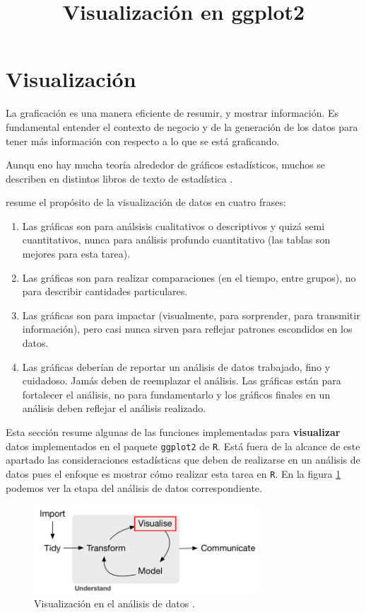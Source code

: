 \documentclass[]{article}
\title{Visualización en ggplot2}
\author{}
\date{}
\providecommand{\tightlist}{%
  \setlength{\itemsep}{0pt}\setlength{\parskip}{0pt}}
\begin{document}
\section{Visualización}\label{visualizacion}

La graficación es una manera eficiente de resumir, y mostrar
información. Es fundamental entender el contexto de negocio y de la
generación de los datos para tener más información con respecto a lo que
se está graficando.

Aunqu eno hay mucha teoría alrededor de gráficos estadísticos, muchos se
describen en distintos libros de texto de estadística
\parencite[][Introducción]{unwin2015}.

\textcite[][citando a John Tukey]{unwin2015} resume el propósito de la
visualización de datos en cuatro frases:

\begin{enumerate}
\def\labelenumi{\arabic{enumi}.}
\tightlist
\item
  Las gráficas son para análsisis cualitativos o descriptivos y quizá
  semi cuantitativos, nunca para análisis profundo cuantitativo (las
  tablas son mejores para esta tarea).
\item
  Las gráficas son para realizar comparaciones (en el tiempo, entre
  grupos), no para describir cantidades particulares.
\item
  Las gráficas son para impactar (visualmente, para sorprender, para
  transmitir información), pero casi nunca sirven para reflejar patrones
  escondidos en los datos.
\item
  Las gráficas deberían de reportar un análisis de datos trabajado, fino
  y cuidadoso. Jamás deben de reemplazar el análisis. Las gráficas están
  para fortalecer el análisis, no para fundamentarlo y los gráficos
  finales en un análisis deben reflejar el análisis realizado.
\end{enumerate}

Esta sección resume algunas de las funciones implementadas para
\textbf{visualizar} datos implementados en el paquete \texttt{ggplot2}
de \texttt{R}. Está fuera de la alcance de este apartado las
consideraciones estadísticas que deben de realizarse en un análisis de
datos pues el enfoque es mostrar cómo realizar esta tarea en \texttt{R}.
En la figura \ref{fig:ciclo4} podemos ver la etapa del análisis de datos
correspondiente.

\begin{figure}[h]
    \centering
    \includegraphics[width=0.75\textwidth]{../img/02_ciclo_4.png}
    \caption{Visualización en el análisis de datos \textcite[Introducción]{grolemund2016r}.}
    \label{fig:ciclo4}
\end{figure}
\end{document}
